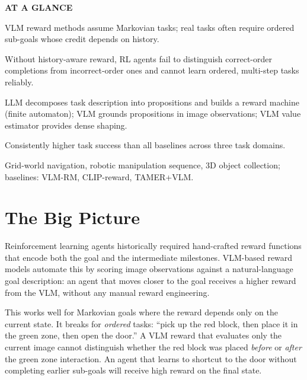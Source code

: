 \documentclass[10pt,twocolumn]{article}
\begin{document}
\begin{mdframed}[backgroundcolor=boxgray,linecolor=rulered,linewidth=1pt,
    innerleftmargin=6pt,innerrightmargin=6pt,
    innertopmargin=6pt,innerbottommargin=6pt]
\textbf{\small AT A GLANCE}\par\vspace{4pt}
\begin{description}[leftmargin=0pt,labelsep=4pt,itemsep=2pt,parsep=0pt,
    font=\small\bfseries]
  \item[Problem:] VLM reward methods assume Markovian tasks; real tasks
    often require ordered sub-goals whose credit depends on history.
  \item[Why it matters:] Without history-aware reward, RL agents
    fail to distinguish correct-order completions from incorrect-order
    ones and cannot learn ordered, multi-step tasks reliably.
  \item[Method:] LLM decomposes task description into propositions and
    builds a reward machine (finite automaton); VLM grounds propositions
    in image observations; VLM value estimator provides dense shaping.
  \item[Result:] Consistently higher task success than all baselines
    across three task domains.
  \item[Evidence:] Grid-world navigation, robotic manipulation sequence,
    3D object collection; baselines: VLM-RM, CLIP-reward, TAMER+VLM.
\end{description}
\end{mdframed}

\section{The Big Picture}

Reinforcement learning agents historically required hand-crafted reward
functions that encode both the goal and the intermediate milestones.
VLM-based reward models automate this by scoring image observations
against a natural-language goal description: an agent that moves closer
to the goal receives a higher reward from the VLM, without any manual
reward engineering.

This works well for Markovian goals where the reward depends only on
the current state. It breaks for \emph{ordered} tasks: ``pick up the
red block, then place it in the green zone, then open the door.'' A VLM
reward that evaluates only the current image cannot distinguish whether
the red block was placed \emph{before} or \emph{after} the green zone
interaction. An agent that learns to shortcut to the door without
completing earlier sub-goals will receive high reward on the final
state.
\end{document}
